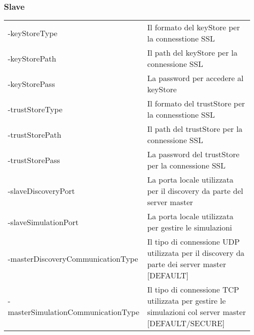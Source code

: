 \subsubsection{Slave}

\begin{table}[H]
    \begin{tabularx}{\linewidth}{ l X }
    -keyStoreType        & Il formato del keyStore per la connesstione SSL       \\
    -keyStorePath        & Il path del keyStore per la connessione SSL           \\
    -keyStorePass        & La password per accedere al keyStore                  \\
    -trustStoreType      & Il formato del trustStore per la connesstione SSL     \\
    -trustStorePath      & Il path del trustStore per la connessione SSL         \\
    -trustStorePass      & La password del trustStore per la connessione SSL     \\
    -slaveDiscoveryPort                & La porta locale utilizzata per il discovery da parte del server master                                              \\
    -slaveSimulationPort & La porta locale utilizzata per gestire le simulazioni \\
    -masterDiscoveryCommunicationType  & Il tipo di connessione UDP utilizzata per il discovery da parte dei server master [DEFAULT]              \\
    -masterSimulationCommunicationType & Il tipo di connessione TCP utilizzata per gestire le simulazioni col server master [DEFAULT/SECURE]
    \end{tabularx}
\end{table}
